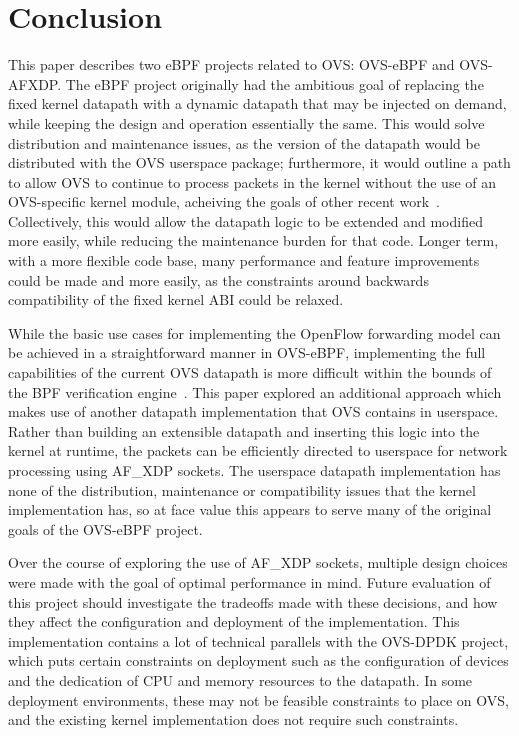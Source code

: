 \documentclass[10pt,numbers,reprint]{sigplanconf}
\begin{document}
\section{Conclusion}
\label{sec:conclusion}
This paper describes two eBPF projects related to OVS: OVS-eBPF and OVS-AFXDP.
The eBPF project originally had the ambitious goal of replacing the fixed
kernel datapath with a dynamic datapath that may be injected on demand, while
keeping the design and operation essentially the same. This would solve
distribution and maintenance issues, as the version of the datapath would be
distributed with the OVS userspace package; furthermore, it would outline a
path to allow OVS to continue to process packets in the kernel without the use
of an OVS-specific kernel module, acheiving the goals of other recent
work~\cite{ovs_tc}. Collectively, this would allow the datapath logic to be
extended and modified more easily, while reducing the maintenance burden for
that code. Longer term, with a more flexible code base, many performance and
feature improvements could be made and more easily, as the constraints around
backwards compatibility of the fixed kernel ABI could be relaxed.

While the basic use cases for implementing the OpenFlow forwarding model can be
achieved in a straightforward manner in OVS-eBPF, implementing the full
capabilities of the current OVS datapath is more difficult within the bounds of
the BPF verification engine~\cite{extensible_ovs}. This paper explored an
additional approach which makes use of another datapath implementation that OVS
contains in userspace. Rather than building an extensible datapath and
inserting this logic into the kernel at runtime, the packets can be efficiently
directed to userspace for network processing using AF\_XDP sockets. The
userspace datapath implementation has none of the distribution, maintenance or
compatibility issues that the kernel implementation has, so at face value this
appears to serve many of the original goals of the OVS-eBPF project.

Over the course of exploring the use of AF\_XDP sockets, multiple design
choices were made with the goal of optimal performance in mind. Future
evaluation of this project should investigate the tradeoffs made with these
decisions, and how they affect the configuration and deployment of the
implementation. This implementation contains a lot of technical parallels with
the OVS-DPDK project, which puts certain constraints on deployment such as the
configuration of devices and the dedication of CPU and memory resources to the
datapath. In some deployment environments, these may not be feasible
constraints to place on OVS, and the existing kernel implementation does not
require such constraints.



\end{document}
